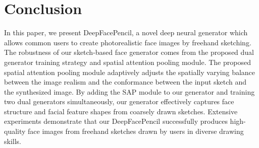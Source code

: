 \documentclass[sigconf,anonymous,review]{acmart}
\begin{document}
\maketitle







\section{Conclusion}
In this paper, we present DeepFacePencil, a novel deep neural generator which allows common users to create photorealistic face images by freehand sketching.
%
The robustness of our sketch-based face generator comes from the proposed dual generator training strategy and spatial attention pooling module. 
%
The proposed spatial attention pooling module adaptively adjusts the spatially varying balance between the image realism and the conformance between the input sketch and the synthesized image. 
%
By adding the SAP module to our generator and training two dual generators simultaneously, our generator effectively captures face structure and facial feature shapes from coarsely drawn sketches. 
Extensive experiments demonstrate that our DeepFacePencil successfully produces high-quality face images from freehand sketches drawn by users in diverse drawing skills.
%




\balance 

%
\end{document}
